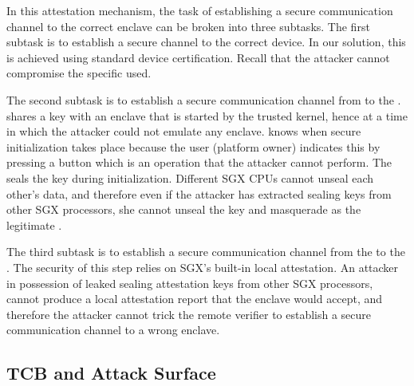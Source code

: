 
In this attestation mechanism, the task of establishing a secure communication channel to the correct enclave can be broken into three subtasks. The first subtask is to establish a secure channel to the correct \device device. In our solution, this is achieved using standard device certification. Recall that the attacker cannot compromise the specific \device used. 

The second subtask is to establish a secure communication channel from \device to the \nameclave. 
\device shares a key with an enclave that is started by the trusted \name kernel, hence at a time in which the attacker could not emulate any enclave. \device knows when secure initialization takes place because the user (platform owner) indicates this by pressing a button which is an operation that the attacker cannot perform. The \nameclave seals the key during initialization. Different SGX CPUs cannot unseal each other's data, and therefore even if the attacker has extracted sealing keys from other SGX processors, she cannot unseal the key and masquerade as the legitimate \nameclave. %

The third subtask is to establish a secure communication channel from the \nameclave to the \app. The security of this step relies on SGX's built-in local attestation. An attacker in possession of leaked sealing attestation keys from other SGX processors, cannot produce a local attestation report that the \name enclave would accept, and therefore the attacker cannot trick the remote verifier to establish a secure communication channel to a wrong enclave.

\iffalse
\subsection{TCB and Attack Surface}

